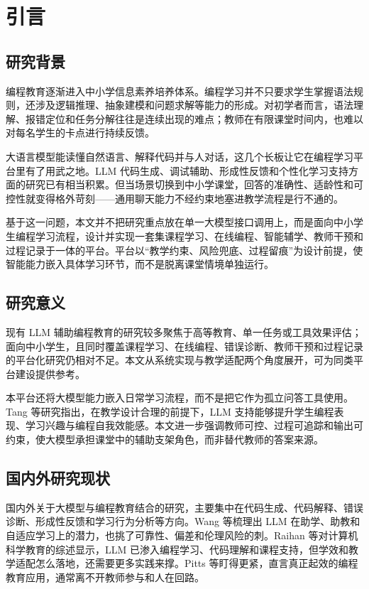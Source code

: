 \chapter{引言}

\section{研究背景}
编程教育逐渐进入中小学信息素养培养体系。编程学习并不只要求学生掌握语法规则，还涉及逻辑推理、抽象建模和问题求解等能力的形成。对初学者而言，语法理解、报错定位和任务分解往往是连续出现的难点；教师在有限课堂时间内，也难以对每名学生的卡点进行持续反馈\cite{tsai2021cts}。

大语言模型能读懂自然语言、解释代码并与人对话，这几个长板让它在编程学习平台里有了用武之地。LLM 代码生成、调试辅助、形成性反馈和个性化学习支持方面的研究已有相当积累\cite{wang2024llmedu,raihan2025cseduslr}。但当场景切换到中小学课堂，回答的准确性、适龄性和可控性就变得格外苛刻——通用聊天能力不经约束地塞进教学流程是行不通的。

基于这一问题，本文并不把研究重点放在单一大模型接口调用上，而是面向中小学生编程学习流程，设计并实现一套集课程学习、在线编程、智能辅学、教师干预和过程记录于一体的平台。平台以“教学约束、风险兜底、过程留痕”为设计前提，使智能能力嵌入具体学习环节，而不是脱离课堂情境单独运行。

\section{研究意义}
现有 LLM 辅助编程教育的研究较多聚焦于高等教育、单一任务或工具效果评估；面向中小学生，且同时覆盖课程学习、在线编程、错误诊断、教师干预和过程记录的平台化研究仍相对不足\cite{raihan2025cseduslr,yim2024k12scoping}。本文从系统实现与教学适配两个角度展开，可为同类平台建设提供参考。

本平台还将大模型能力嵌入日常学习流程，而不是把它作为孤立问答工具使用。Tang 等研究指出，在教学设计合理的前提下，LLM 支持能够提升学生编程表现、学习兴趣与编程自我效能感\cite{tang2025middleschool}。本文进一步强调教师可控、过程可追踪和输出可约束，使大模型承担课堂中的辅助支架角色，而非替代教师的答案来源。

\section{国内外研究现状}
国内外关于大模型与编程教育结合的研究，主要集中在代码生成、代码解释、错误诊断、形成性反馈和学习行为分析等方向。Wang 等梳理出 LLM 在助学、助教和自适应学习上的潜力，也挑了可靠性、偏差和伦理风险的刺\cite{wang2024llmedu}。Raihan 等对计算机科学教育的综述显示，LLM 已渗入编程学习、代码理解和课程支持，但学效和教学适配怎么落地，还需要更多实践来撑\cite{raihan2025cseduslr}。Pitts 等盯得更紧，直言真正起效的编程教育应用，通常离不开教师参与和人在回路\cite{pitts2025llmprogedu}。

